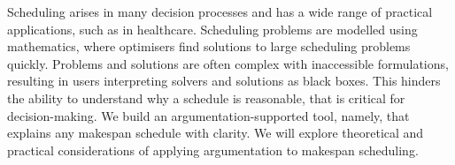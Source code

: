 Scheduling arises in many decision processes and has a wide range of practical applications, such as in healthcare. Scheduling problems are modelled using mathematics, where optimisers find solutions to large scheduling problems quickly. Problems and solutions are often complex with inaccessible formulations, resulting in users interpreting solvers and solutions as black boxes. This hinders the ability to understand why a schedule is reasonable, that is critical for decision-making.
\linespace
We build an argumentation-supported tool, namely, \emph{\toolname} that explains any makespan schedule with clarity. We will explore theoretical and practical considerations of applying argumentation to makespan scheduling.